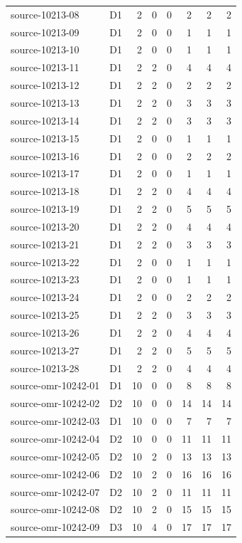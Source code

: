 \begin{longtable}{p{}lrrrrrr}
source-10213-08 & D1 & 2 & 0 & 0 & 2 & 2 & 2\\
source-10213-09 & D1 & 2 & 0 & 0 & 1 & 1 & 1\\
source-10213-10 & D1 & 2 & 0 & 0 & 1 & 1 & 1\\
source-10213-11 & D1 & 2 & 2 & 0 & 4 & 4 & 4\\
source-10213-12 & D1 & 2 & 2 & 0 & 2 & 2 & 2\\
source-10213-13 & D1 & 2 & 2 & 0 & 3 & 3 & 3\\
source-10213-14 & D1 & 2 & 2 & 0 & 3 & 3 & 3\\
source-10213-15 & D1 & 2 & 0 & 0 & 1 & 1 & 1\\
source-10213-16 & D1 & 2 & 0 & 0 & 2 & 2 & 2\\
source-10213-17 & D1 & 2 & 0 & 0 & 1 & 1 & 1\\
source-10213-18 & D1 & 2 & 2 & 0 & 4 & 4 & 4\\
source-10213-19 & D1 & 2 & 2 & 0 & 5 & 5 & 5\\
source-10213-20 & D1 & 2 & 2 & 0 & 4 & 4 & 4\\
source-10213-21 & D1 & 2 & 2 & 0 & 3 & 3 & 3\\
source-10213-22 & D1 & 2 & 0 & 0 & 1 & 1 & 1\\
source-10213-23 & D1 & 2 & 0 & 0 & 1 & 1 & 1\\
source-10213-24 & D1 & 2 & 0 & 0 & 2 & 2 & 2\\
source-10213-25 & D1 & 2 & 2 & 0 & 3 & 3 & 3\\
source-10213-26 & D1 & 2 & 2 & 0 & 4 & 4 & 4\\
source-10213-27 & D1 & 2 & 2 & 0 & 5 & 5 & 5\\
source-10213-28 & D1 & 2 & 2 & 0 & 4 & 4 & 4\\
source-omr-10242-01 & D1 & 10 & 0 & 0 & 8 & 8 & 8\\
source-omr-10242-02 & D2 & 10 & 0 & 0 & 14 & 14 & 14\\
source-omr-10242-03 & D1 & 10 & 0 & 0 & 7 & 7 & 7\\
source-omr-10242-04 & D2 & 10 & 0 & 0 & 11 & 11 & 11\\
source-omr-10242-05 & D2 & 10 & 2 & 0 & 13 & 13 & 13\\
source-omr-10242-06 & D2 & 10 & 2 & 0 & 16 & 16 & 16\\
source-omr-10242-07 & D2 & 10 & 2 & 0 & 11 & 11 & 11\\
source-omr-10242-08 & D2 & 10 & 2 & 0 & 15 & 15 & 15\\
source-omr-10242-09 & D3 & 10 & 4 & 0 & 17 & 17 & 17\\

\end{longtable}
